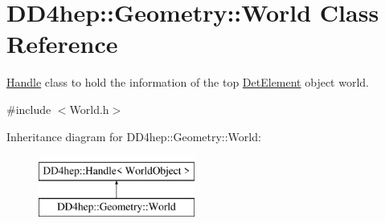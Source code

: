 \hypertarget{class_d_d4hep_1_1_geometry_1_1_world}{}\section{D\+D4hep\+:\+:Geometry\+:\+:World Class Reference}
\label{class_d_d4hep_1_1_geometry_1_1_world}


\hyperlink{class_d_d4hep_1_1_handle}{Handle} class to hold the information of the top \hyperlink{class_d_d4hep_1_1_geometry_1_1_det_element}{Det\+Element} object \textquotesingle{}world\textquotesingle{}.  




{\ttfamily \#include $<$World.\+h$>$}

Inheritance diagram for D\+D4hep\+:\+:Geometry\+:\+:World\+:\begin{figure}[H]
\begin{center}
\leavevmode
\includegraphics[height=2.000000cm]{class_d_d4hep_1_1_geometry_1_1_world}
\end{center}
\end{figure}
